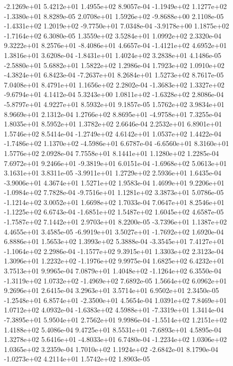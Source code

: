 -2.1269e+01  5.4212e+01  1.4955e+02  8.9057e-04
-1.1949e+02  1.1277e+02 -1.3380e+01  8.8289e-05
 2.0708e+01  1.5926e+02 -9.8688e+00  2.1108e-05
-1.4331e+02  1.2019e+02 -9.7750e+01  7.0348e-04
-3.9178e+00  1.1875e+02 -1.7164e+02  6.3080e-05
1.3559e+02 3.5284e+01 1.0992e+02  2.3320e-04
 9.3222e+01  8.2576e+01 -8.4086e+01  4.6657e-04
-1.4121e+02  4.6952e+01  1.3816e+01  3.6208e-04
-1.8431e+01  1.4024e+02  3.2838e+01  4.1486e-05
-2.5880e+01  5.6882e+01  1.5822e+02  1.2986e-04
 1.7923e+02  1.0910e+02 -4.3824e+01  6.8423e-04
-7.2637e+01  8.2684e+01  1.5273e+02  8.7617e-05
7.0408e+01 8.4791e+01 1.1656e+02  2.2802e-04
-1.3683e+02  1.3327e+02 -9.6794e+01  4.1412e-04
 5.3243e+00  1.0811e+02 -1.6328e+02  2.8086e-04
-5.8797e+01  4.9227e+01  8.5932e+01  9.1857e-05
1.5762e+02 3.9834e+01 8.9669e+01  2.1312e-04
 1.2766e+02  8.8695e+01 -4.9758e+01  7.3255e-04
1.8035e+01 8.5952e+01 1.3782e+02  2.6646e-04
2.2532e+01 6.8901e+01 1.5746e+02  8.5414e-04
-1.2749e+02  4.6142e+01  1.0537e+02  1.4422e-04
-1.7486e+02  1.1370e+02 -4.5986e+01  6.6787e-04
-6.6560e+01  8.3160e+01  1.5776e+02  2.0928e-04
7.7558e+01 8.1441e+01 1.1280e+02  1.2285e-04
 7.6972e+01  9.2466e+01 -9.3819e+01  6.0151e-04
-1.6968e+02  5.0613e+01  3.1631e+01  3.8311e-05
-3.9911e+01  1.2729e+02  2.5936e+01  1.6435e-04
-3.9006e+01  4.3674e+01  1.5271e+02  1.9583e-04
 1.4699e+01  9.2206e+01 -1.0984e+02  7.7828e-04
-9.7516e+01  1.1281e+02  3.3873e+01  5.0786e-05
-1.1214e+02  3.0052e+01  1.6698e+02  1.7033e-04
 7.0647e+01  8.2546e+01 -1.1225e+02  6.6743e-04
-1.6851e+02  1.5487e+02  1.6045e+02  4.6587e-05
-1.7587e+02  7.1442e+01  2.9703e+01  8.2200e-05
-3.7396e+01  1.1387e+02  4.4655e+01  3.4585e-05
-6.9919e+01  3.5027e+01 -1.7692e+02  1.6920e-04
6.8886e+01 1.5653e+02 1.3993e+02  5.3888e-04
-3.3545e+01  7.4127e+01 -1.1064e+02  2.2986e-04
-1.1577e+02  9.3915e+01  1.3303e+02  2.3123e-04
 1.3096e+01  1.2232e+02 -1.1976e+02  9.9975e-04
1.6825e+02 6.4232e+01 3.7513e+01  9.9965e-04
 7.0879e+01  1.4048e+02 -1.1264e+02  6.3550e-04
-1.3119e+02  1.0732e+02 -1.4969e+02  7.6892e-05
1.5664e+02 6.0962e+01 9.2696e+01  2.6415e-04
3.2963e+01 3.5714e+01 6.9502e+01  2.3450e-05
-1.2548e+01  6.8574e+01 -2.3500e+01  4.5654e-04
1.0391e+02 7.8469e+01 1.0712e+02  4.0932e-04
-1.6383e+02  4.5988e+01 -7.3319e+01  1.3414e-04
-7.3895e+01  5.9504e+01  2.7562e+01  9.9986e-04
-1.5514e+02  1.2151e+02  1.4188e+02  5.4086e-04
 9.4725e+01  8.5531e+01 -7.6893e+01  4.5895e-04
 1.3278e+02  5.6416e+01 -4.8033e+01  6.7480e-04
-1.2234e+02  1.0306e+02  1.0365e+02  3.2359e-04
 1.7010e+02  1.1924e+02 -2.6842e-01  8.1790e-04
-1.0273e+02  4.2114e+01  1.5742e+02  1.8903e-05
